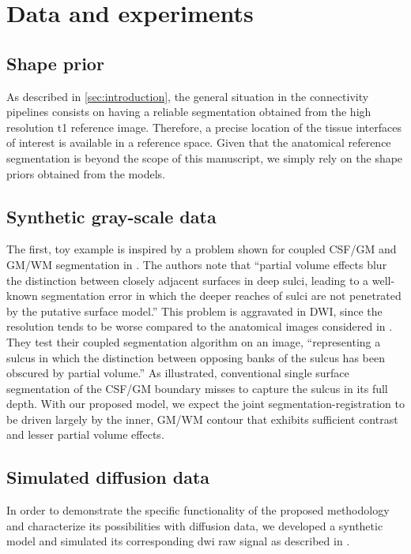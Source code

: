 \section{Data and experiments}
\label{sec:experiments}
%
\subsection{Shape prior}
%
As described in \autoref{sec:introduction}, the general situation in
the connectivity pipelines consists on having 
a reliable segmentation obtained from the high resolution \ac{t1} 
reference image. Therefore, a precise location of the tissue interfaces
of interest is available in a reference space. Given that the anatomical reference segmentation is beyond the scope of this manuscript, we simply rely on the shape priors obtained from the models. \\

%
\subsection{Synthetic gray-scale data}
%
The first, toy example is inspired by a problem shown for coupled CSF/GM and GM/WM segmentation in \cite{MacDonald2000}. The authors note that ``partial volume effects blur the distinction between closely adjacent surfaces in deep sulci, leading to a well-known segmentation error in which the deeper reaches of sulci are not penetrated by the putative surface model.'' This problem is aggravated in DWI, since the resolution tends to be worse compared to the anatomical images considered in \cite{MacDonald2000}. They test their coupled segmentation algorithm on an image, ``representing a sulcus in which the distinction between opposing banks of the sulcus has been obscured by partial volume.''  As illustrated, conventional single surface segmentation of the CSF/GM boundary misses to capture the sulcus in its full depth. With our proposed model, we expect the joint segmentation-registration to be driven largely by the inner, GM/WM contour that exhibits sufficient contrast and lesser partial volume effects.

%
\subsection{Simulated diffusion data}
%
In order to demonstrate the specific functionality of the proposed
methodology and characterize its possibilities with diffusion data, we developed a
synthetic model and simulated its corresponding \ac{dwi}
raw signal as described in \citep{tuch_q-ball_2004}. 

